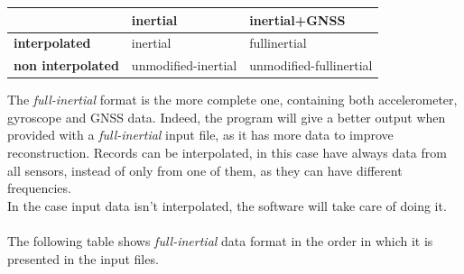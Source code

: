 \begin{center}
\begin{table}[H]
\begin{tabular}{l|l|l|}
\cline{2-3}
 & \textbf{inertial} & \textbf{inertial+GNSS} \\ \hline
\multicolumn{1}{|l|}{\textbf{interpolated}} & inertial & fullinertial \\ \hline
\multicolumn{1}{|l|}{\textbf{non interpolated}} & unmodified-inertial & unmodified-fullinertial \\ \hline
\end{tabular}
\end{table}

\end{center}

\justify
The \textit{full-inertial} format is the more complete one, containing both accelerometer, gyroscope and GNSS data. Indeed, the program will give a better output when provided with a \textit{full-inertial} input file, as it has more data to improve reconstruction. 
Records can be interpolated, in this case have always data from all sensors, instead of only from one of them, as they can have different frequencies. \\
In the case input data isn't interpolated, the software will take care of doing it. \\
\\
The following table shows \textit{full-inertial} data format in the order in which it is presented in the input files.

